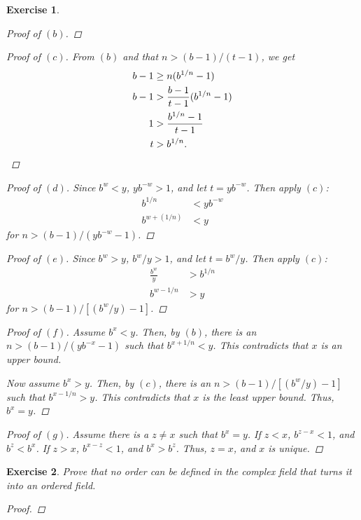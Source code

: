 \documentclass[10pt,letterpaper]{amsart}
\newtheorem{exercise}{Exercise}[section]
\theoremstyle{definition}
\theoremstyle{remark}
\numberwithin{equation}{exercise}
\begin{document}
\begin{multicols}{2}
\begin{exercise}
\begin{proof}[Proof of $(b)$]
    \end{proof}
    \begin{proof}[Proof of $(c)$]
      From $(b)$ and that $n > (b-1)/(t-1)$, we get
      \begin{align*}
        b - 1 &\ge n(b^{1/n} - 1)\\
        b-1 &> \frac{b-1}{t-1}(b^{1/n} - 1)\\
        1 &> \frac{b^{1/n} - 1}{t-1}\\
        t &> b^{1/n}.\qedhere
      \end{align*}
    \end{proof}
    \begin{proof}[Proof of $(d)$]
      Since $b^w < y$, $yb^{-w} > 1$, and let $t = yb^{-w}$. Then apply $(c)$:
      \begin{align*}
        b^{1/n} &< yb^{-w}\\
        b^{w + (1/n)} &< y
      \end{align*}
      for $n > (b-1)/(yb^{-w} - 1)$.
    \end{proof}
    \begin{proof}[Proof of $(e)$]
      Since $b^w > y$, $b^w/y > 1$, and let $t = b^w/y$. Then apply $(c)$:
      \begin{align*}
        \frac{b^w}{y} &> b^{1/n}\\
        b^{w-1/n} &> y
      \end{align*}
      for $n > (b-1)/[(b^w/y) - 1]$.
    \end{proof}
    \begin{proof}[Proof of $(f)$]
      Assume $b^x < y$. Then, by $(b)$, there is an $n > (b-1)/(yb^{-x} - 1)$ such that $b^{x+1/n} < y$. This contradicts that $x$ is an upper bound.
      \par Now assume $b^x > y$. Then, by $(c)$, there is an $n > (b-1)/[(b^w/y) - 1]$ such that $b^{x-1/n} > y$. This contradicts that $x$ is the least upper bound. Thus, $b^x = y$.
    \end{proof}
    \begin{proof}[Proof of $(g)$]
      Assume there is a $z \ne x$ such that $b^x = y$. If $z < x$, $b^{z-x} < 1$, and $b^z < b^x$. If $z > x$, $b^{x-z} < 1$, and $b^x > b^z$. Thus, $z = x$, and $x$ is unique.
    \end{proof}
  \end{exercise}
  \begin{exercise}\label{1.8}
    Prove that no order can be defined in the complex field that turns it into an ordered field.
    \begin{proof}

\end{proof}
\end{exercise}
\end{multicols}
\end{document}

